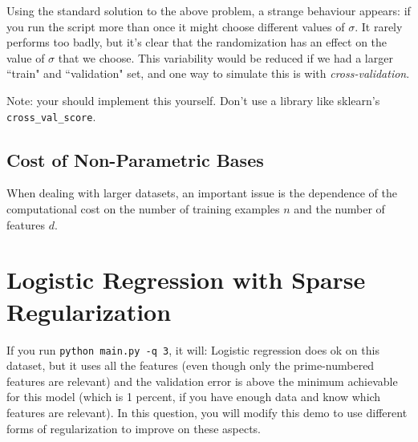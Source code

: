 \documentclass{article}
\begin{document}
Using the standard solution to the above problem, a strange behaviour appears:
if you run the script more than once it might choose different values of $\sigma$.
It rarely performs too badly, but it's clear that the randomization has an effect
on the value of $\sigma$ that we choose. This variability would be reduced if we
had a larger ``train" and ``validation" set, and one way to simulate this is
with \emph{cross-validation}. 

Note: your should implement this yourself. Don't use a library like sklearn's \verb|cross_val_score|.


\subsection{Cost of Non-Parametric Bases}

When dealing with larger datasets, an important issue is the dependence of the
computational cost on the number of training examples $n$ and the number of
features $d$. 


\section{Logistic Regression with Sparse Regularization}

If you run  \verb|python main.py -q 3|, it will:
Logistic regression does ok on this dataset,
but it uses all the features (even though only the prime-numbered features are relevant)
and the validation error is above the minimum achievable for this model
(which is 1 percent, if you have enough data and know which features are relevant).
In this question, you will modify this demo to use different forms of regularization
 to improve on these aspects.
\end{document}
